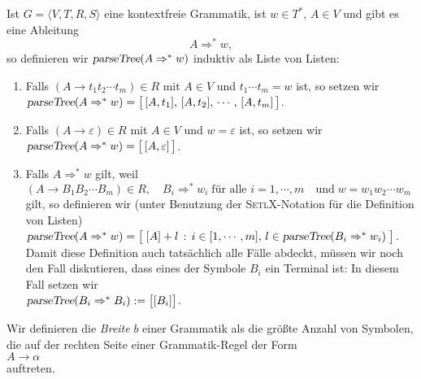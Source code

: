 \begin{Definition} \lb
Ist $G = \langle V, T, R, S \rangle$ eine kontextfreie Grammatik, ist $w \in T^*$, $A \in V$ und  gibt es eine Ableitung
\[ A \Rightarrow^* w,  \]
so definieren wir $\textsl{parseTree}(A \Rightarrow^* w)$ induktiv als Liste von Listen:
\begin{enumerate}
\item Falls $(A \rightarrow t_1t_2 \cdots t_m)\in R$ mit $A \in V$ und $t_1 \cdots t_m = w$ ist,
      so setzen wir
      \\[0.2cm]
      \hspace*{1.3cm}
      $\textsl{parseTree}(A \Rightarrow^* w) = \bigl[\, [A, t_1],\,  [A, t_2],\,\cdots,\,  [A, t_m]\, \bigr]$.  
\item Falls $(A \rightarrow \varepsilon)\in R$ mit $A \in V$ und $w = \varepsilon$ ist, so setzen wir
      \\[0.2cm]
      \hspace*{1.3cm}
      $\textsl{parseTree}(A \Rightarrow^* w) = \bigl[\, [A, \varepsilon]\, \bigr]$.  
\item Falls  $A \Rightarrow^* w$ gilt, weil
      \\[0.2cm]
      \hspace*{1.3cm}
      $ (A \rightarrow B_1B_2 \cdots B_m) \in R, \quad 
         B_i \Rightarrow^* w_i\; \mbox{f\"ur alle $i=1,\cdots,m$} \quad
         \mbox{und} \; w = w_1w_2 \cdots w_m
      $
      \\[0.2cm]
      gilt, so definieren wir (unter Benutzung der \textsc{SetlX}-Notation f\"ur die Definition von Listen)
      \\[0.2cm]
      \hspace*{1.3cm}
      $ 
        \textsl{parseTree}(A \Rightarrow^*w)  =
        \bigl[\; [A] + l \,:\,
                 i \in [1, \cdots, m ],\, l \in \textsl{parseTree}(B_i \Rightarrow^* w_i) \;
        \bigr]
      $.
      \\[0.2cm]
      Damit diese Definition auch tats\"achlich alle F\"alle abdeckt, m\"ussen wir noch den Fall
      diskutieren, dass  eines der Symbole $B_i$ ein Terminal ist: In diesem Fall setzen wir
      \\[0.2cm]
      \hspace*{1.3cm}
      $\textsl{parseTree}(B_i \Rightarrow^* B_i) := \bigl[ [B_i] \bigr]$.
\end{enumerate}
\end{Definition}

Wir definieren die \emph{Breite} $b$ einer Grammatik als die gr\"o{\ss}te Anzahl von Symbolen, die 
auf der rechten Seite einer Grammatik-Regel der Form
\\[0.2cm]
\hspace*{1.3cm}
$A \rightarrow \alpha$
\\[0.2cm]
auftreten.  

